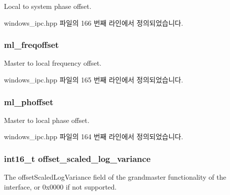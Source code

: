 Local to system phase offset. 



windows\+\_\+ipc.\+hpp 파일의 166 번째 라인에서 정의되었습니다.

\subsubsection[{\texorpdfstring{ml\+\_\+freqoffset}{ml_freqoffset}}]{ ml\+\_\+freqoffset}\hypertarget{class_offset_aafeb4d0fa7d3cb53ee3686b804e47617}{}\label{class_offset_aafeb4d0fa7d3cb53ee3686b804e47617}


Master to local frequency offset. 



windows\+\_\+ipc.\+hpp 파일의 165 번째 라인에서 정의되었습니다.

\subsubsection[{\texorpdfstring{ml\+\_\+phoffset}{ml_phoffset}}]{ ml\+\_\+phoffset}\hypertarget{class_offset_a707b32410dd96584191405fcc6b1b10d}{}\label{class_offset_a707b32410dd96584191405fcc6b1b10d}


Master to local phase offset. 



windows\+\_\+ipc.\+hpp 파일의 164 번째 라인에서 정의되었습니다.

\subsubsection[{\texorpdfstring{offset\+\_\+scaled\+\_\+log\+\_\+variance}{offset_scaled_log_variance}}]{\setlength{\rightskip}{0pt plus 5cm}int16\+\_\+t offset\+\_\+scaled\+\_\+log\+\_\+variance}\hypertarget{class_offset_a022841cfc4d83dc906f116eec53f1d9a}{}\label{class_offset_a022841cfc4d83dc906f116eec53f1d9a}


The offset\+Scaled\+Log\+Variance field of the grandmaster functionality of the interface, or 0x0000 if not supported. 



